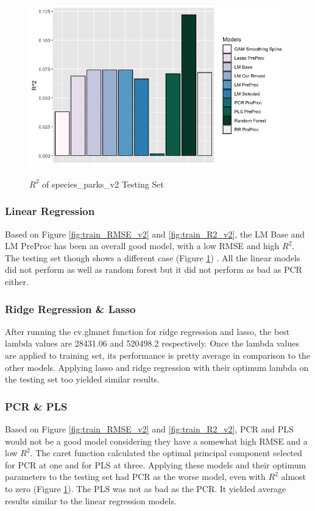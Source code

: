 \documentclass[stu, floatsintext, 11pt]{apa7}
\begin{document}
\begin{figure}[h!]
\centering
\caption{$R^2$ of species\_parks\_v2 Testing Set}
\includegraphics[scale=0.6]{images/test_R2_v2.png}
\label{fig:test_R2_v2}
\end{figure}

\subsubsection{Linear Regression}
Based on Figure \ref{fig:train_RMSE_v2} and \ref{fig:train_R2_v2}, the LM Base and LM PreProc has been an overall good model, with a low RMSE and high $R^2$. The testing set though shows a different case (Figure \ref{fig:test_R2_v2}) . All the linear models did not perform as well as random forest but it did not perform as bad as PCR either.

\subsubsection{Ridge Regression \& Lasso}
After running the cv.glmnet function for ridge regression and lasso, the best lambda values are 28431.06 and 520498.2 respectively. Once the lambda values are applied to training set, its performance is pretty average in comparison to the other models. Applying lasso and ridge regression with their optimum lambda on the testing set too yielded similar results.

\subsubsection{PCR \& PLS}
Based on Figure \ref{fig:train_RMSE_v2} and \ref{fig:train_R2_v2}, PCR and PLS would not be a good model considering they have a somewhat high RMSE and a low $R^2$. The caret function calculated the optimal principal component selected for PCR at one and for PLS at three. Applying these models and their optimum parameters to the testing set had PCR as the worse model, even with $R^2$ almost to zero (Figure \ref{fig:test_R2_v2}). The PLS was not as bad as the PCR. It yielded average results similar to the linear regression models.
\end{document}
